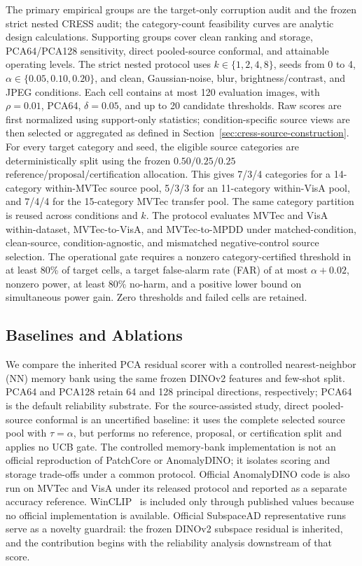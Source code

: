 The primary empirical groups are the target-only corruption audit and the frozen strict nested CRESS audit; the category-count feasibility curves are analytic design calculations. Supporting groups cover clean ranking and storage, PCA64/PCA128 sensitivity, direct pooled-source conformal, and attainable operating levels. The strict nested protocol uses $k\in\{1,2,4,8\}$, seeds from 0 to 4, $\alpha\in\{0.05,0.10,0.20\}$, and clean, Gaussian-noise, blur, brightness/contrast, and JPEG conditions. Each cell contains at most 120 evaluation images, with $\rho=0.01$, PCA64, $\delta=0.05$, and up to 20 candidate thresholds. Raw scores are first normalized using support-only statistics; condition-specific source views are then selected or aggregated as defined in Section~\ref{sec:cress-source-construction}. For every target category and seed, the eligible source categories are deterministically split using the frozen $0.50/0.25/0.25$ reference/proposal/certification allocation. This gives 7/3/4 categories for a 14-category within-MVTec source pool, 5/3/3 for an 11-category within-VisA pool, and 7/4/4 for the 15-category MVTec transfer pool. The same category partition is reused across conditions and $k$. The protocol evaluates MVTec and VisA within-dataset, MVTec-to-VisA, and MVTec-to-MPDD under matched-condition, clean-source, condition-agnostic, and mismatched negative-control source selection. The operational gate requires a nonzero category-certified threshold in at least 80\% of target cells, a target false-alarm rate (FAR) of at most $\alpha+0.02$, nonzero power, at least 80\% no-harm, and a positive lower bound on simultaneous power gain. Zero thresholds and failed cells are retained.

\subsection{Baselines and Ablations}
We compare the inherited PCA residual scorer with a controlled nearest-neighbor (NN) memory bank using the same frozen DINOv2 features and few-shot split. PCA64 and PCA128 retain 64 and 128 principal directions, respectively; PCA64 is the default reliability substrate. For the source-assisted study, direct pooled-source conformal is an uncertified baseline: it uses the complete selected source pool with $\tau=\alpha$, but performs no reference, proposal, or certification split and applies no UCB gate. The controlled memory-bank implementation is not an official reproduction of PatchCore or AnomalyDINO; it isolates scoring and storage trade-offs under a common protocol. Official AnomalyDINO code is also run on MVTec and VisA under its released protocol and reported as a separate accuracy reference. WinCLIP~\cite{winclip2023} is included only through published values because no official implementation is available. Official SubspaceAD representative runs serve as a novelty guardrail: the frozen DINOv2 subspace residual is inherited, and the contribution begins with the reliability analysis downstream of that score.

